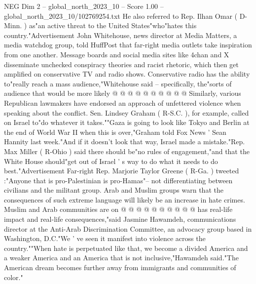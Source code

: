 \begin{textsample}{NEG Dim 2 – global\_north\_2023\_10 – Score 1.00 – global\_north\_2023\_10/102769254.txt}
He also referred to Rep.
Ilhan Omar ( D-Minn. ) as"an active threat to the United States"who"hates this country."Advertisement John Whitehouse, news director at Media Matters, a media watchdog group, told HuffPost that far-right media outlets take inspiration from one another.
Message boards and social media sites like 4chan and X disseminate unchecked conspiracy theories and racist rhetoric, which then get amplified on conservative TV and radio shows.
Conservative radio has the ability to"really reach a mass audience,"Whitehouse said -- specifically, the"sorts of audience that would be more likely @ @ @ @ @ @ @ @ @ @ Similarly, various Republican lawmakers have endorsed an approach of unfettered violence when speaking about the conflict.
Sen.
Lindsey Graham ( R-S.C. ), for example, called on Israel to"do whatever it takes.""Gaza is going to look like Tokyo and Berlin at the end of World War II when this is over,"Graham told Fox News ' Sean Hannity last week."And if it doesn't look that way, Israel made a mistake."Rep.
Max Miller ( R-Ohio ) said there should be"no rules of engagement,"and that the White House should"get out of Israel ' s way to do what it needs to do best."Advertisement Far-right Rep.
Marjorie Taylor Greene ( R-Ga. ) tweeted :"Anyone that is pro-Palestinian is pro-Hamas"-- not differentiating between civilians and the militant group.
Arab and Muslim groups warn that the consequences of such extreme language will likely be an increase in hate crimes.
Muslim and Arab communities are on @ @ @ @ @ @ @ @ @ @ has real-life impact and real-life consequences,"said Jasmine Hawamdeh, communications director at the Anti-Arab Discrimination Committee, an advocacy group based in Washington, D.C."We ' ve seen it manifest into violence across the country.""When hate is perpetuated like that, we become a divided America and a weaker America and an America that is not inclusive,"Hawamdeh said."The American dream becomes further away from immigrants and communities of color."

\end{textsample}
